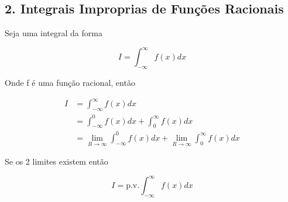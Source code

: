 \documentclass{article}
\begin{document}
\subsection*{2. Integrais Improprias de Funções Racionais}
Seja uma integral da forma

\begin{equation*}
    I = \int_{-\infty}^\infty f(x) d x
\end{equation*}

Onde f é uma função racional, então

\begin{align*}
    I &= \int_{-\infty}^\infty f(x) d x \\
    &= \int_{- \infty}^0 f(x) d x + \int_0^\infty f(x) d x \\
    &= \lim_{R \to \infty} \int_{- \infty}^0 f(x) d x + \lim_{R \to \infty} \int_0^\infty f(x) d x 
\end{align*}

Se os 2 limites existem então

\begin{equation*}
    I = \mathrm{p.v.} \int_{- \infty}^\infty f(x) d x
\end{equation*}
\end{document}
